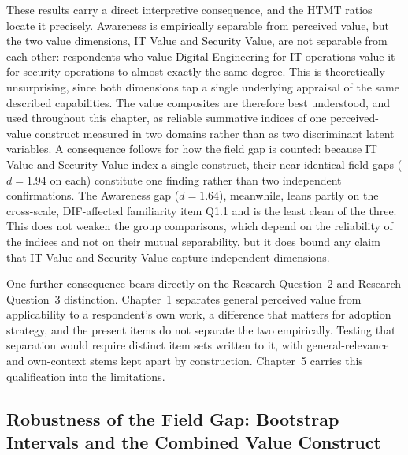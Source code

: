 These results carry a direct interpretive consequence, and the HTMT ratios locate it precisely. Awareness is empirically separable from perceived value, but the two value dimensions, IT Value and Security Value, are not separable from each other: respondents who value Digital Engineering for IT operations value it for security operations to almost exactly the same degree. This is theoretically unsurprising, since both dimensions tap a single underlying appraisal of the same described capabilities. The value composites are therefore best understood, and used throughout this chapter, as reliable summative indices of one perceived-value construct measured in two domains rather than as two discriminant latent variables. A consequence follows for how the field gap is counted: because IT Value and Security Value index a single construct, their near-identical field gaps ($d=1.94$ on each) constitute one finding rather than two independent confirmations. The Awareness gap ($d=1.64$), meanwhile, leans partly on the cross-scale, DIF-affected familiarity item Q1.1 and is the least clean of the three. This does not weaken the group comparisons, which depend on the reliability of the indices and not on their mutual separability, but it does bound any claim that IT Value and Security Value capture independent dimensions.

One further consequence bears directly on the Research Question~2 and Research Question~3 distinction. Chapter~1 separates general perceived value from applicability to a respondent's own work, a difference that matters for adoption strategy, and the present items do not separate the two empirically. Testing that separation would require distinct item sets written to it, with general-relevance and own-context stems kept apart by construction. Chapter~5 carries this qualification into the limitations.

\subsection{Robustness of the Field Gap: Bootstrap Intervals and the Combined Value Construct}


